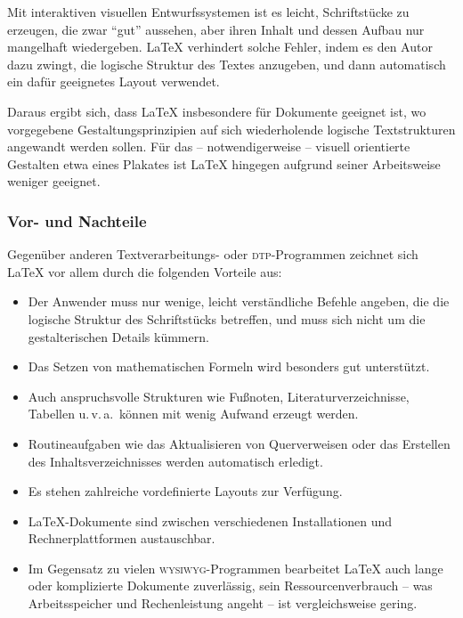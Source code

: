 Mit interaktiven visuellen Entwurfssystemen ist es leicht,  
Schriftstücke zu erzeugen, die zwar \enquote{gut} aussehen,
aber ihren Inhalt und dessen Aufbau nur mangelhaft wiedergeben.
\LaTeX{} verhindert solche
Fehler, indem es den Autor dazu zwingt, die logische
Struktur des Textes anzugeben, und dann automatisch ein dafür
geeignetes Layout verwendet.

Daraus ergibt sich, dass \LaTeX{} insbesondere für  Dokumente geeignet 
ist, wo vorgegebene Gestaltungsprinzipien auf sich wiederholende
logische Textstrukturen angewandt werden sollen. 
Für das -- notwendigerweise -- visuell orientierte Gestalten
etwa eines Plakates ist \LaTeX{} hingegen 
aufgrund seiner Arbeitsweise weniger geeignet.

\subsubsection{Vor- und Nachteile}

Gegenüber anderen Textverarbeitungs- oder \textsc{dtp}-Programmen 
zeichnet sich \LaTeX{} vor allem durch die folgenden Vorteile aus:

\begin{itemize}
\item Der Anwender muss nur wenige, leicht verständliche Befehle
  angeben, die die logische Struktur des Schriftstücks
  betreffen, und muss sich nicht um die gestalterischen Details
  kümmern.
\item Das Setzen von mathematischen Formeln wird besonders gut
  unterstützt.
\item Auch anspruchsvolle Strukturen wie Fußnoten, Literaturverzeichnisse,
  Tabellen u.\,v.\,a.\  können mit wenig Aufwand erzeugt werden.
\item Routineaufgaben wie das Aktualisieren von Querverweisen
 oder das Erstellen des Inhaltsverzeichnisses 
 werden automatisch erledigt.
\item Es stehen zahlreiche vordefinierte Layouts zur Verfügung.
\item \LaTeX-Dokumente sind zwischen verschiedenen Installationen und
 Rechnerplattformen austauschbar.
\item Im Gegensatz zu vielen \textsc{wysiwyg}-Programmen bearbeitet \LaTeX{} auch
  lange oder komplizierte Dokumente zuverlässig, sein Ressourcenverbrauch -- was Arbeitsspeicher und Rechenleistung angeht -- ist vergleichsweise
  gering.
\end{itemize}

